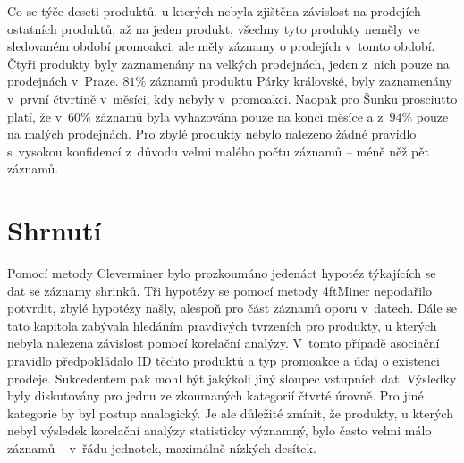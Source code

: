 Co se týče deseti produktů, u kterých nebyla zjištěna závislost na prodejích ostatních produktů, až na jeden produkt, všechny tyto produkty neměly ve sledovaném období promoakci, ale měly záznamy o prodejích v~tomto období. Čtyři produkty byly zaznamenány na velkých prodejnách, jeden z~nich pouze na prodejnách v~Praze. $81\%$ záznamů produktu Párky královské, byly zaznamenány v~první čtvrtině v~měsíci, kdy nebyly v~promoakci. Naopak pro Šunku prosciutto platí, že v~60\% záznamů byla vyhazována pouze na konci měsíce a z~$94\%$ pouze na malých prodejnách. Pro zbylé produkty nebylo nalezeno žádné pravidlo s~vysokou konfidencí z~důvodu velmi malého počtu záznamů -- méně něž pět záznamů.

\section*{Shrnutí}

Pomocí metody Cleverminer bylo prozkoumáno jedenáct hypotéz týkajících se dat se záznamy shrinků. Tři hypotézy se pomocí metody 4ftMiner nepodařilo potvrdit, zbylé hypotézy našly, alespoň pro část záznamů oporu v~datech.
Dále se tato kapitola zabývala hledáním pravdivých tvrzeních pro produkty, u kterých nebyla nalezena závislost pomocí korelační analýzy. V~tomto případě asociační pravidlo předpokládalo ID těchto produktů a typ promoakce a údaj o existenci prodeje. Sukcedentem pak mohl být jakýkoli jiný sloupec vstupních dat. Výsledky byly diskutovány pro jednu ze zkoumaných kategorií čtvrté úrovně. Pro jiné kategorie by byl postup analogický.
Je ale důležité zmínit, že produkty, u kterých nebyl výsledek korelační analýzy statisticky významný, bylo často velmi málo záznamů -- v~řádu jednotek, maximálně nízkých desítek.


